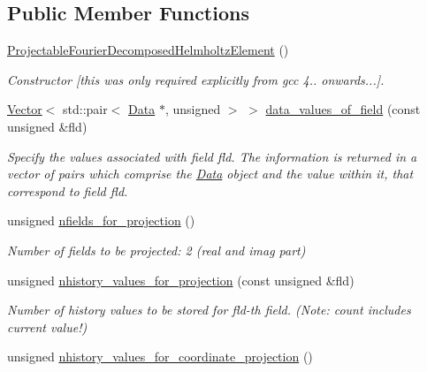 \subsection*{Public Member Functions}
\begin{DoxyCompactItemize}
\item 
\hyperlink{classoomph_1_1ProjectableFourierDecomposedHelmholtzElement_a2cd1deafcbc0f63b017a98cf8d067110}{Projectable\+Fourier\+Decomposed\+Helmholtz\+Element} ()
\begin{DoxyCompactList}\small\item\em Constructor \mbox{[}this was only required explicitly from gcc 4.. onwards...\mbox{]}. \end{DoxyCompactList}\item 
\hyperlink{classoomph_1_1Vector}{Vector}$<$ std\+::pair$<$ \hyperlink{classoomph_1_1Data}{Data} $\ast$, unsigned $>$ $>$ \hyperlink{classoomph_1_1ProjectableFourierDecomposedHelmholtzElement_a0644ce309555150976c0e5e16ea2dd1f}{data\+\_\+values\+\_\+of\+\_\+field} (const unsigned \&fld)
\begin{DoxyCompactList}\small\item\em Specify the values associated with field fld. The information is returned in a vector of pairs which comprise the \hyperlink{classoomph_1_1Data}{Data} object and the value within it, that correspond to field fld. \end{DoxyCompactList}\item 
unsigned \hyperlink{classoomph_1_1ProjectableFourierDecomposedHelmholtzElement_a222ce07a334691bbff3f3ec7c8049ada}{nfields\+\_\+for\+\_\+projection} ()
\begin{DoxyCompactList}\small\item\em Number of fields to be projected\+: 2 (real and imag part) \end{DoxyCompactList}\item 
unsigned \hyperlink{classoomph_1_1ProjectableFourierDecomposedHelmholtzElement_ade916dec0e853569db95b0538fcabb2a}{nhistory\+\_\+values\+\_\+for\+\_\+projection} (const unsigned \&fld)
\begin{DoxyCompactList}\small\item\em Number of history values to be stored for fld-\/th field. (Note\+: count includes current value!) \end{DoxyCompactList}\item 
unsigned \hyperlink{classoomph_1_1ProjectableFourierDecomposedHelmholtzElement_ab1f9e43fe32a5c09fefe61f324a650cc}{nhistory\+\_\+values\+\_\+for\+\_\+coordinate\+\_\+projection} ()

\end{DoxyCompactItemize}
